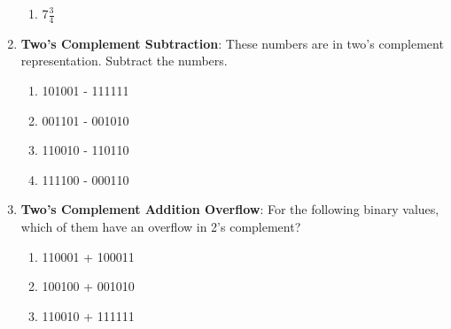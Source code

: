 \documentclass{article}
\begin{document}
\begin{enumerate}[label=(\alph*)]
\begin{enumerate}[label=(\roman*)]
        \item $7 \frac{3}{4}$
    \end{enumerate}
    \item \textbf{Two's Complement Subtraction}: These numbers are in two’s complement representation.  Subtract the numbers.
    \begin{enumerate}[label=(\roman*)]
        \item 101001 - 111111
        \item 001101 - 001010
        \item 110010 - 110110
        \item 111100 - 000110
    \end{enumerate}
    \item \textbf{Two's Complement Addition Overflow}: For the following binary values, which of them have an overflow in 2’s complement?
    \begin{enumerate}[label=(\roman*)]
        \item 110001 + 100011
        \item 100100 + 001010
        \item 110010 + 111111
    \end{enumerate}
\end{enumerate}
\newpage
\end{document}
